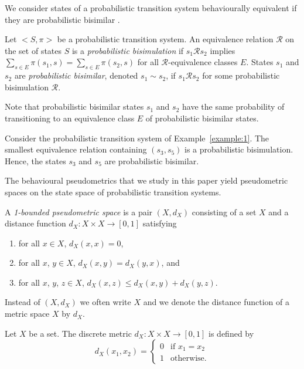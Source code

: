 \documentclass{LMCS}
\begin{document}
We consider states of a probabilistic transition system behaviourally
equivalent if they are probabilistic bisimilar \cite{LS91:ic}.

\begin{defi}
Let $<S, \pi>$ be a probabilistic transition system. An equivalence relation $\mathcal{R}$ 
on the set of states $S$ is a {\sl probabilistic bisimulation\/} if 
$s_1 \mathbin{\mathcal{R}} s_2$ implies $\sum_{s \in E} \pi(s_1, s) = \sum_{s \in E} \pi(s_2, s)$ 
for all $\mathcal{R}$-equivalence classes $E$.  States $s_1$ and $s_2$ are 
{\sl probabilistic bisimilar\/}, denoted $s_1 \sim s_2$, if $s_1 \mathbin{\mathcal{R}} s_2$ 
for some probabilistic bisimulation $\mathcal{R}$.
\end{defi}

Note that probabilistic bisimilar states $s_1$ and $s_2$ have the same probability of 
transitioning to an equivalence class $E$ of probabilistic bisimilar states.

\begin{exa}
Consider the probabilistic transition system of Example~\ref{example:1}.
The smallest equivalence relation containing $(s_3, s_5)$ is a probabilistic bisimulation.  
Hence, the states $s_3$ and $s_5$ are probabilistic bisimilar.
\end{exa}

The behavioural pseudometrics that we study in this paper yield pseudometric spaces
on the state space of probabilistic transition systems.

\begin{defi}
\label{definition:3}
A {\sl 1-bounded pseudometric space\/} is a pair $(X, d_X)$ consisting of a
set $X$ and a distance function $d_X : X \times X \to [0, 1]$ satisfying
\begin{enumerate}[(1)]
\item
for all $x \in X$, $d_X(x, x) = 0$,
\item
for all $x$, $y \in X$, $d_X(x, y) = d_X(y, x)$, and
\item
for all $x$, $y$, $z \in X$, $d_X(x, z) \leq d_X(x, y) + d_X(y, z)$.
\end{enumerate}
Instead of $(X, d_X)$ we often write $X$ and we denote the distance function
of a metric space $X$ by $d_X$.
\end{defi}

\begin{exa}
Let $X$ be a set.  The discrete metric $d_X : X \times X \to [0, 1]$
is defined by
\begin{displaymath}
d_X(x_1, x_2) = \left \{
\begin{array}{ll}
0 & \mbox{if $x_1 = x_2$}\\
1 & \mbox{otherwise.}
\end{array}
\right .
\end{displaymath}
\end{exa}
\end{document}
